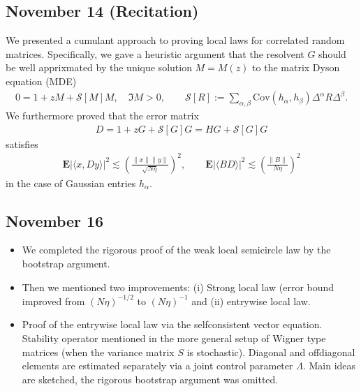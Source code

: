 \documentclass[letterpaper,10pt,english]{sphinxhowto}
\begin{document}
\subsection{November 14 (Recitation)}
\label{\detokenize{teaching/random_matrices_2017:november-14-recitation}}
\sphinxAtStartPar
We presented a cumulant approach to proving local laws for correlated random matrices. Specifically, we gave a heuristic argument that the resolvent \(G\) should be well apprixmated by the unique solution \(M=M(z)\) to the matrix Dyson equation (MDE)
\begin{equation*}
\begin{split}
0=1+zM+\mathcal S[M]M, \quad \Im M>0,\qquad \mathcal S[R]:= \sum_{\alpha,\beta}\text{Cov}(h_\alpha,h_\beta) \Delta^\alpha R\Delta^\beta.
\end{split}
\end{equation*}
We furthermore proved that the error matrix
\begin{equation*}
\begin{split}
D=1+zG+\mathcal S[G]G=HG+\mathcal S[G]G
\end{split}
\end{equation*}
satisfies
\begin{equation*}
\begin{split}
\mathbf E\lvert\langle x,Dy \rangle\rvert^2 \lesssim \left(\frac{\lVert x\rVert \lVert y\rVert}{\sqrt{N\eta}}\right)^2,\qquad \mathbf E\lvert\langle BD \rangle\rvert^2 \lesssim \left(\frac{\lVert B\rVert}{N\eta}\right)^2
\end{split}
\end{equation*}
in the case of Gaussian entries \(h_\alpha\).


\subsection{November 16}
\label{\detokenize{teaching/random_matrices_2017:november-16}}\begin{itemize}
\item {} 
\sphinxAtStartPar
We completed the rigorous proof of the weak local semicircle law
by the bootstrap argument.

\item {} 
\sphinxAtStartPar
Then we mentioned two improvements: (i) Strong local law (error bound improved from \((N \eta)^{-1/2}\) to \((N\eta)^{-1}\) and (ii) entrywise local law.

\item {} 
\sphinxAtStartPar
Proof of the entrywise local law via the self\sphinxhyphen{}consistent vector equation. Stability operator mentioned in the more general setup of Wigner type matrices (when the variance matrix \(S\) is stochastic). Diagonal and offdiagonal elements are estimated separately via a joint control parameter \(\Lambda\). Main ideas are sketched, the rigorous bootstrap argument was omitted.

\end{itemize}
\end{document}
